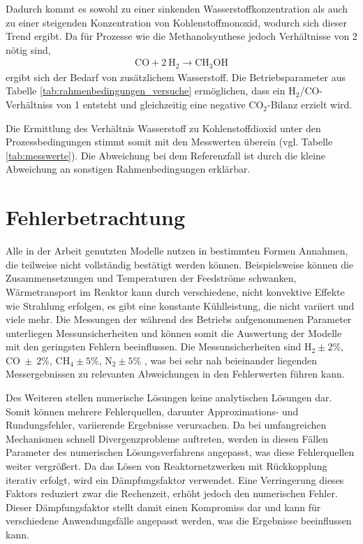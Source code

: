         Dadurch kommt es sowohl zu einer sinkenden Wasserstoffkonzentration als auch zu einer steigenden Konzentration von Kohlenstoffmonoxid, wodurch sich dieser Trend ergibt. Da für Prozesse wie die Methanolsynthese jedoch Verhältnisse von 2 nötig sind,
        \begin{align}
            \mathrm{CO + 2\ H_2 \longrightarrow CH_3OH}
        \end{align}
        ergibt sich der Bedarf von zusätzlichem Wasserstoff. Die Betriebsparameter aus Tabelle \ref{tab:rahmenbedingungen_versuche} ermöglichen, dass ein H$_2$/CO-Verhältniss von 1 entsteht und gleichzeitig eine negative CO$_2$-Bilanz erzielt wird. 

        Die Ermittlung des Verhältnis Wasserstoff zu Kohlenstoffdioxid unter den Prozessbedingungen stimmt somit mit den Messwerten überein (vgl. Tabelle \ref{tab:messwerte}). Die Abweichung bei dem Referenzfall ist durch die kleine Abweichung an sonstigen Rahmenbedingungen erklärbar.
    \section{Fehlerbetrachtung}
        Alle in der Arbeit genutzten Modelle nutzen in bestimmten Formen Annahmen, die teilweise nicht vollständig bestätigt werden können. Beispielsweise können die Zusammensetzungen und Temperaturen der Feedströme schwanken, Wärmetransport im Reaktor kann durch verschiedene, nicht konvektive Effekte wie Strahlung erfolgen, es gibt eine konstante Kühlleistung, die nicht variiert und viele mehr. Die Messungen der während des Betriebs aufgenommenen Parameter unterliegen Messunsicherheiten und können somit die Auswertung der Modelle mit den geringsten Fehlern beeinflussen. Die Messunsicherheiten sind H$_2 \pm 2\%$, CO$\ \pm\ 2\%$, CH$_4 \pm 5\%$, N$_2 \pm 5\%$ \cite{RICHTER2015110}, was bei sehr nah beieinander liegenden Messergebnissen zu relevanten Abweichungen in den Fehlerwerten führen kann.

        Des Weiteren stellen numerische Lösungen keine analytischen Lösungen dar. Somit können mehrere Fehlerquellen, darunter Approximations- und Rundungsfehler, variierende Ergebnisse verursachen. Da bei umfangreichen Mechanismen schnell Divergenzprobleme auftreten, werden in diesen Fällen Parameter des numerischen Lösungsverfahrens angepasst, was diese Fehlerquellen weiter vergrößert. Da das Lösen von Reaktornetzwerken mit Rückkopplung iterativ erfolgt, wird ein Dämpfungsfaktor verwendet. Eine Verringerung dieses Faktors reduziert zwar die Rechenzeit, erhöht jedoch den numerischen Fehler. Dieser Dämpfungsfaktor stellt damit einen Kompromiss dar und kann für verschiedene Anwendungsfälle angepasst werden, was die Ergebnisse beeinflussen kann.  

